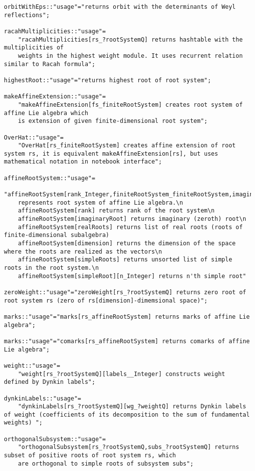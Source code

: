 \documentclass[preprint,12pt]{article}
\begin{document}
\begin{lstlisting}
orbitWithEps::"usage"="returns orbit with the determinants of Weyl reflections";

racahMultiplicities::"usage"=
    "racahMultiplicities[rs_?rootSystemQ] returns hashtable with the multiplicities of 
    weights in the highest weight module. It uses recurrent relation similar to Racah formula";

highestRoot::"usage"="returns highest root of root system";

makeAffineExtension::"usage"=
    "makeAffineExtension[fs_finiteRootSystem] creates root system of affine Lie algebra which 
    is extension of given finite-dimensional root system";

OverHat::"usage"=
    "OverHat[rs_finiteRootSystem] creates affine extension of root system rs, it is equivalent makeAffineExtension[rs], but uses mathematical notation in notebook interface";

affineRootSystem::"usage"=
    "affineRootSystem[rank_Integer,finiteRootSystem_finiteRootSystem,imaginaryRoot_affineWeight,realRoots_List] 
    represents root system of affine Lie algebra.\n
    affineRootSystem[rank] returns rank of the root system\n
    affineRootSystem[imaginaryRoot] returns imaginary (zeroth) root\n
    affineRootSystem[realRoots] returns list of real roots (roots of finite-dimensional subalgebra)
    affineRootSystem[dimension] returns the dimension of the space where the roots are realized as the vectors\n
    affineRootSystem[simpleRoots] returns unsorted list of simple roots in the root system.\n
    affineRootSystem[simpleRoot][n_Integer] returns n'th simple root"

zeroWeight::"usage"="zeroWeight[rs_?rootSystemQ] returns zero root of root system rs (zero of rs[dimension]-dimemsional space)"; 

marks::"usage"="marks[rs_affineRootSystem] returns marks of affine Lie algebra";

marks::"usage"="comarks[rs_affineRootSystem] returns comarks of affine Lie algebra";

weight::"usage"=
    "weight[rs_?rootSystemQ][labels__Integer] constructs weight defined by Dynkin labels";

dynkinLabels::"usage"=
    "dynkinLabels[rs_?rootSystemQ][wg_?weightQ] returns Dynkin labels of weight (coefficients of its decomposition to the sum of fundamental weights) ";

orthogonalSubsystem::"usage"=
    "orthogonalSubsystem[rs_?rootSystemQ,subs_?rootSystemQ] returns subset of positive roots of root system rs, which 
    are orthogonal to simple roots of subsystem subs";


\end{lstlisting}
\end{document}
